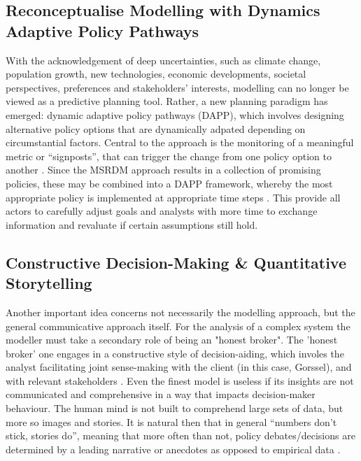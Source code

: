 \subsection{Reconceptualise Modelling with Dynamics Adaptive Policy Pathways}

With the acknowledgement of deep uncertainties, such as climate change, population growth, new technologies, economic developments, societal perspectives, preferences and stakeholders’ interests, modelling can no longer be viewed as a predictive planning tool. Rather, a new planning paradigm has emerged: dynamic adaptive policy pathways (DAPP), which involves designing alternative policy options that are dynamically adpated depending on circumstantial factors. Central to the approach is the monitoring of a meaningful metric or “signposts”, that can trigger the change from one policy option to another \parencite{haasnoot_dynamic_2013}. Since the MSRDM approach results in a collection of promising policies, these may be combined into a DAPP framework, whereby the most appropriate policy is implemented at appropriate time steps \parencite{kwakkel_developing_2015}. This provide all actors to carefully adjust goals and analysts with more time to exchange information and revaluate if certain assumptions still hold. 

\subsection{Constructive Decision-Making \& Quantitative Storytelling}

Another important idea concerns not necessarily the modelling approach, but the general communicative approach itself. For the analysis of a complex system the modeller must take a secondary role of being an "honest broker". The 'honest broker' one engages in a constructive style of decision-aiding, which involes the analyst facilitating joint sense-making with the client (in this case, Gorssel), and with relevant stakeholders \parencite{tsoukias_decision_2008}. Even the finest model is useless if its insights are not communicated and comprehensive in a way that impacts decision-maker behaviour. The human mind is not built to comprehend large sets of data, but more so images and stories. It is natural then that in general “numbers don’t stick, stories do”, meaning that more often than not, policy debates/decisions are determined by a leading narrative or anecdotes as opposed to empirical data \parencite{kettl_making_2016}.  

